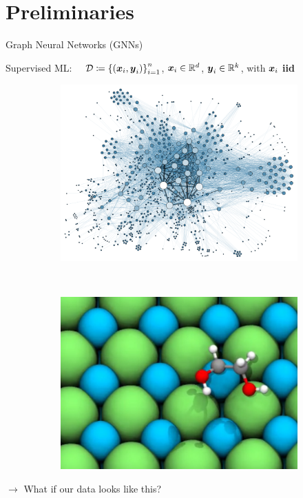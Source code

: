 \section{Preliminaries}

\begin{frame}{Graph Neural Networks (GNNs)}

    Supervised ML: $\quad \mathcal{D} \coloneqq \left\{(\boldsymbol{x}_i, \boldsymbol{y}_i)\right\}_{i=1}^n$, $\boldsymbol{x}_i \in \mathbb{R}^{d}$, $\boldsymbol{y}_i \in \mathbb{R}^k$, with $\boldsymbol{x}_i$ \textbf{iid}

    \begin{figure}[H]
        \begin{subfigure}[t]{0.3\textwidth}
            \includegraphics[width=\textwidth]{figures/gnns/social_network.png}
        \end{subfigure} \hspace*{1em}%
        ~
        \begin{subfigure}[t]{0.3\textwidth}
            \includegraphics[width=\textwidth]{figures/gnns/molecule.png}
        \end{subfigure}
        \vspace*{-1em}
    \end{figure}

    $\rightarrow$ What if our data looks like this?
\end{frame}


